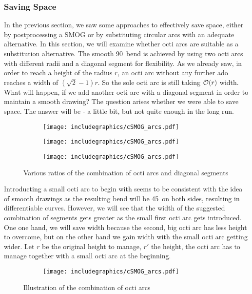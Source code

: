 \subsubsection{Saving Space}
In the previous section, we saw some approaches to effectively save space, either by postprocessing a SMOG or by substituting circular arcs with an adequate alternative. In this section, we will examine whether octi arcs are suitable as a substitution alternative. The smooth 90\degree~bend is achieved by using two octi arcs with different radii and a diagonal segment for flexibility. As we already saw, in order to reach a height of the radius $r$, an octi arc without any further ado reaches a width of $(\sqrt{2}-1)r$. So the sole octi arc is still taking $\mathcal{O}(r)$ width. What will happen, if we add another octi arc with a diagonal segment in order to maintain a smooth drawing? The question arises whether we were able to save space. The answer will be - a little bit, but not quite enough in the long run.
\begin{figure}[H]
	\centering
	\begin{subfigure}{0.33\textwidth}
		\centering
		\texttt{[image: includegraphics/cSMOG\_arcs.pdf]}
	\end{subfigure}
	\begin{subfigure}{0.33\textwidth}
		\centering
		\texttt{[image: includegraphics/cSMOG\_arcs.pdf]}
	\end{subfigure}\begin{subfigure}{0.33\textwidth}
		\centering
		\texttt{[image: includegraphics/cSMOG\_arcs.pdf]}
	\end{subfigure}
	\caption{Various ratios of the combination of octi arcs and diagonal segments}
\end{figure}
Introducting a small octi arc to begin with seems to be consistent with the idea of smooth drawings as the resulting bend will be 45\degree~on both sides, resulting in differentiable curves. However, we will see that the width of the suggested combination of segments gets greater as the small first octi arc gets introduced. One one hand, we will save width because the second, big octi arc has less height to overcome, but on the other hand we gain width with the small octi arc getting wider. Let $r$ be the original height to manage, $r'$ the height, the octi arc has to manage together with a small octi arc at the beginning.
\begin{figure}[H]
	\centering
	\begin{subfigure}{0.4\textwidth}
		\centering
		\texttt{[image: includegraphics/cSMOG\_arcs.pdf]}
	\end{subfigure}
	\caption{Illustration of the combination of octi arcs}\label{im:cSMOG}
\end{figure}
